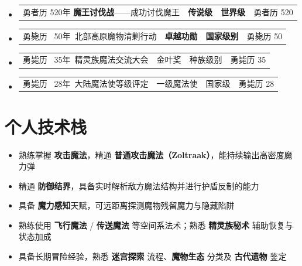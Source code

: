 \documentclass[11pt,a4paper]{article}
\newcommand*{\boldtext}[1]{{\bfseries #1}}
\newcommand{\globalIconSize}{12pt}
\newcommand{\secicon}[1]{{\color{globalIconColor}\fontsize{\globalIconSize}{\globalIconSize}\selectfont #1}}
\begin{document}
\begin{itemize}
    \item \begin{tabular}[t]{@{} p{} p{} p{} r @{}}
        勇者历 520年 {\boldtext{魔王讨伐战}}——成功讨伐魔王 & \boldtext{传说级} & \boldtext{世界级} & 勇者历 520
    \end{tabular}
    \item \begin{tabular}[t]{@{} p{} p{} p{} r @{}}
        勇毙历 \ 50年\ 北部高原魔物清剿行动                   & \boldtext{卓越功勋} & \boldtext{国家级别} & 勇毙历 50
    \end{tabular}
    \item \begin{tabular}[t]{@{} p{} p{} p{} r @{}}
        勇毙历 \ 35年\ 精灵族魔法交流大会                       & 金叶奖 & 种族级别 & 勇毙历 35
    \end{tabular}
    \item \begin{tabular}[t]{@{} p{} p{} p{} r @{}}
        勇毙历 \ 28年\ 大陆魔法使等级评定                         & 一级魔法使 & 国家级 & 勇毙历 28
    \end{tabular}
\end{itemize}

\section{\secicon{\faCode}\hspace{0.5em}个人技术栈}
\begin{itemize}
    \item 熟练掌握 \boldtext{攻击魔法}，精通 \boldtext{普通攻击魔法（Zoltraak）}，能持续输出高密度魔力弹
    \item 精通 \boldtext{防御结界}，具备实时解析敌方魔法结构并进行护盾反制的能力
    \item 具备 \boldtext{魔力感知}天赋，可远距离探测魔物残留魔力与隐藏陷阱
    \item 熟练使用 \boldtext{飞行魔法} / \boldtext{传送魔法} 等空间系法术；熟悉 \boldtext{精灵族秘术} 辅助恢复与状态加成
    \item 具备长期冒险经验，熟悉 \boldtext{迷宫探索} 流程、\boldtext{魔物生态} 分类及 \boldtext{古代遗物} 鉴定
\end{itemize}
\end{document}
